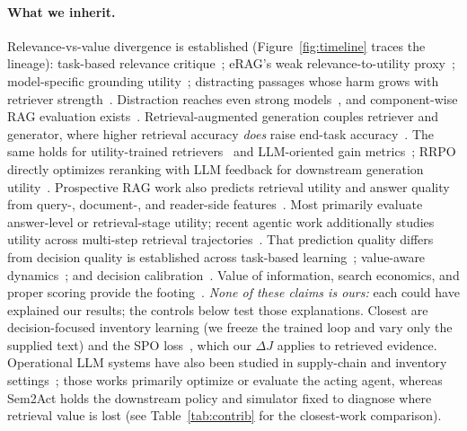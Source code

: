 \documentclass[a4paper,runningheads]{llncs}
\begin{document}
\paragraph{What we inherit.}
Relevance-vs-value divergence is established (Figure~\ref{fig:timeline}
traces the lineage): task-based relevance
critique~\cite{borlund2003concept}; eRAG's weak
relevance-to-utility proxy~\cite{salemi2024erag}; model-specific
grounding utility~\cite{grogu2026}; distracting passages whose harm grows
with retriever strength~\cite{cuconasu2024power,yoran2024making}.
Distraction reaches even strong models~\cite{shi2023large}, and
component-wise RAG evaluation exists~\cite{saadfalcon2023ares,es2023ragas}.
Retrieval-augmented generation couples retriever and generator, where
higher retrieval accuracy \emph{does} raise end-task
accuracy~\cite{lewis2020rag,karpukhin2020dpr}. The same holds for
utility-trained retrievers~\cite{xu2025scarlet} and LLM-oriented gain
metrics~\cite{trappolini2026redefining}; RRPO directly optimizes reranking
with LLM feedback for downstream generation utility~\cite{wu2026rrpo}.
Prospective RAG work also predicts retrieval utility and answer quality from
query-, document-, and reader-side features~\cite{tian2026predicting}.
Most primarily evaluate
answer-level or retrieval-stage utility; recent agentic work additionally
studies utility across multi-step retrieval
trajectories~\cite{mukhopadhyay2026bridge}. That
prediction quality differs from decision quality is established across
task-based learning~\cite{donti2017task,elmachtoub2022smart,mandi2022rank};
value-aware dynamics~\cite{farahmand2017value,lambert2020objective};
and decision calibration~\cite{zhao2021decision}. Value of
information, search economics, and proper
scoring provide the footing~\cite{howard1966information,azzopardi2011economics,guo2017calibration,degroot1983comparison,niculescu2005predicting}. \emph{None of these claims is ours:} each could have
explained our results; the controls below test those explanations. Closest are decision-focused inventory learning (we
freeze the trained loop and vary only the
supplied text) and the SPO
loss~\cite{elmachtoub2022smart}, which our $\Delta J$ applies to retrieved
evidence. Operational LLM systems have also been studied in supply-chain
and inventory settings~\cite{li2023optiguide,yoshizato2026agents}; those
works primarily optimize or evaluate the acting agent, whereas Sem2Act
holds the downstream policy and simulator fixed to diagnose where
retrieval value is lost (see
Table~\ref{tab:contrib} for the closest-work comparison).
\end{document}
